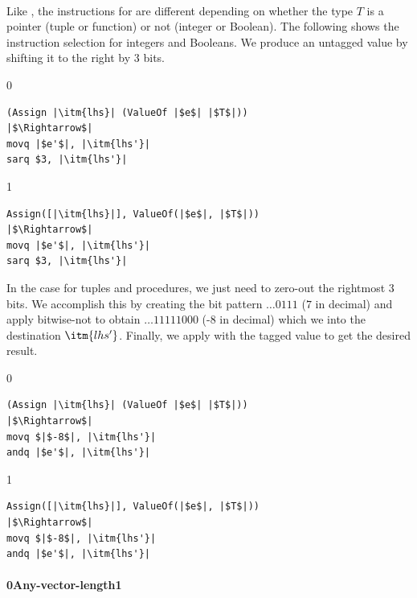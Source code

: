 \documentclass[7x10,nocrop]{TimesAPriori_MIT}%
\def\racketEd{0}
\def\pythonEd{1}
\def\edition{0}
\newcommand{\racket}[1]{{\if\edition\racketEd{#1}\fi}}
\newcommand{\python}[1]{{\if\edition\pythonEd #1\fi}}
\begin{document}
\paragraph{}

Like , the instructions for  are
different depending on whether the type $T$ is a pointer (tuple or
function) or not (integer or Boolean). The following shows the
instruction selection for integers and Booleans.  We produce an
untagged value by shifting it to the right by 3 bits.
%
{\if\edition\racketEd
\begin{lstlisting}
(Assign |\itm{lhs}| (ValueOf |$e$| |$T$|))
|$\Rightarrow$|
movq |$e'$|, |\itm{lhs'}|
sarq $3, |\itm{lhs'}|
\end{lstlisting}
\fi}
%
{\if\edition\pythonEd
\begin{lstlisting}
Assign([|\itm{lhs}|], ValueOf(|$e$|, |$T$|))
|$\Rightarrow$|
movq |$e'$|, |\itm{lhs'}|
sarq $3, |\itm{lhs'}|
\end{lstlisting}
\fi}
%
In the case for tuples and procedures, we just need to zero-out the
rightmost 3 bits. We accomplish this by creating the bit pattern
$\ldots 0111$ ($7$ in decimal) and apply bitwise-not to obtain $\ldots
11111000$ (-8 in decimal) which we  into the destination
$\itm{lhs'}$.  Finally, we apply  with the tagged value to
get the desired result.
%
{\if\edition\racketEd
\begin{lstlisting}
(Assign |\itm{lhs}| (ValueOf |$e$| |$T$|))
|$\Rightarrow$|
movq $|$-8$|, |\itm{lhs'}|
andq |$e'$|, |\itm{lhs'}|
\end{lstlisting}
\fi}
%
{\if\edition\pythonEd
\begin{lstlisting}
Assign([|\itm{lhs}|], ValueOf(|$e$|, |$T$|))
|$\Rightarrow$|
movq $|$-8$|, |\itm{lhs'}|
andq |$e'$|, |\itm{lhs'}|
\end{lstlisting}
\fi}



\paragraph{\racket{Any-vector-length}\python{}}
\end{document}
